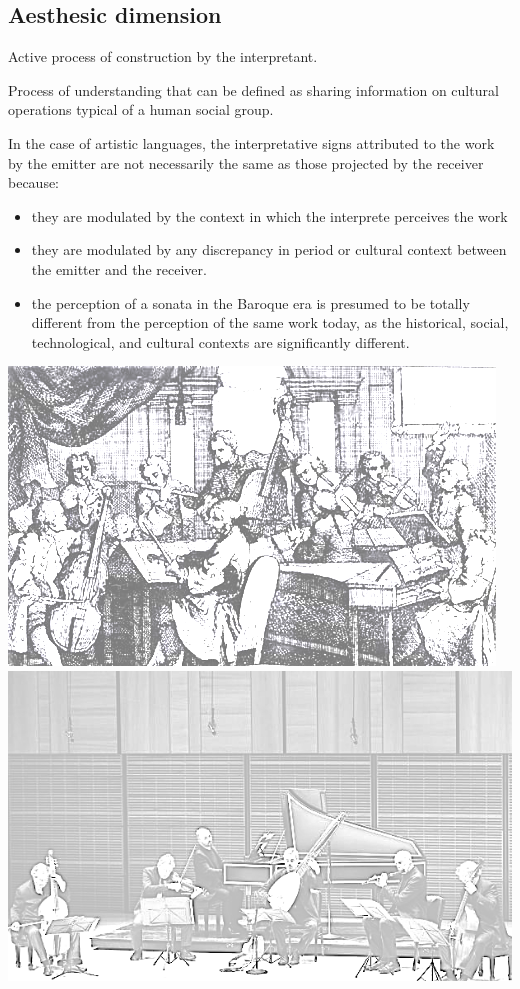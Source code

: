 \subsection{Aesthesic dimension}\label{aesthesic-dimension}

Active process of construction by the interpretant.

Process of understanding that can be defined as sharing information on cultural operations typical of a human social group.

In the case of artistic languages, the interpretative signs attributed to the work by the emitter are not necessarily the same as those projected by the receiver because:

\begin{itemize}
\tightlist
\item they are modulated by the context in which the interprete perceives the work
\item they are modulated by any discrepancy in period or cultural context between the emitter and the receiver.
\item the perception of a sonata in the Baroque era is presumed to be totally different from the perception of the same work today, as the historical, social, technological, and cultural contexts are significantly different.
\end{itemize}

\begin{center}
\includegraphics[scale=0.35]{../img/barocca.png}
\includegraphics[scale=1]{../img/moderna.png}
\end{center}

